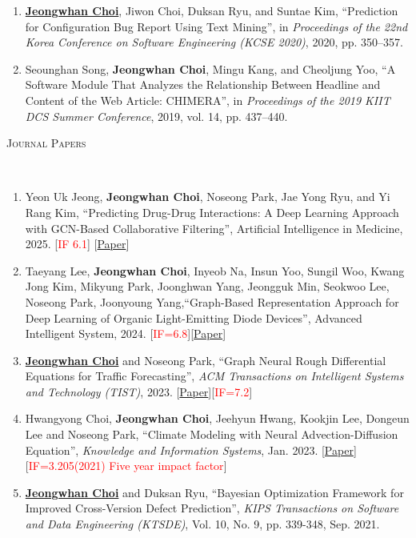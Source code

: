 \documentclass[10pt]{article}
\newenvironment{changemargin}[2]{
  \begin{list}{}{
    \setlength{\topsep}{0pt}
    \setlength{\leftmargin}{#1}
    \setlength{\rightmargin}{#2}
    \setlength{\listparindent}{\parindent}
    \setlength{\itemindent}{\parindent}
    \setlength{\parsep}{\parskip}
  }
  \item[]}{\end{list}
}
\newcommand{\lineover}{
	\begin{changemargin}{-0.05in}{-0.05in}
		\vspace*{-8pt}
		\hrulefill \\
		\vspace*{-2pt}
	\end{changemargin}
}
\newcommand{\RED}[1]{\textcolor{red}{#1}}
\newcommand{\textbu}[1]{\underline{\textbf{#1}}}
\newenvironment{body} {
	\vspace*{-16pt}
	\begin{changemargin}{-0.25in}{-0.5in}
  }
	{\end{changemargin}
}
\begin{document}
\begin{body}
\begin{enumerate}
    \item \textbu{Jeongwhan Choi}, Jiwon Choi, Duksan Ryu, and Suntae Kim, ``Prediction for Configuration Bug Report Using Text Mining'', in \emph{Proceedings of the 22nd Korea Conference on Software Engineering (KCSE 2020)}, 2020, pp. 350–357.
    \item Seounghan Song, \textbf{Jeongwhan Choi}, Mingu Kang, and Cheoljung Yoo, ``A Software Module That Analyzes the Relationship Between Headline and Content of the Web Article: CHIMERA'', in \emph{Proceedings of the 2019 KIIT DCS Summer Conference}, 2019, vol. 14, pp. 437–440.
\end{enumerate}


\vspace{1em}
\textsc{Journal Papers}
\lineover
\begin{enumerate}
    \item Yeon Uk Jeong, \textbf{Jeongwhan Choi}, Noseong Park, Jae Yong Ryu, and Yi Rang Kim, ``Predicting Drug-Drug Interactions: A Deep Learning Approach with GCN-Based Collaborative Filtering'', Artificial Intelligence in Medicine, 2025. [\RED{IF 6.1}] [\href{https://doi.org/10.1016/j.artmed.2025.103185}{Paper}]
    \item Taeyang Lee, \textbf{Jeongwhan Choi}, Inyeob Na, Insun Yoo, Sungil Woo, Kwang Jong Kim, Mikyung Park, Joonghwan Yang, Jeongguk Min, Seokwoo Lee, Noseong Park, Joonyoung Yang,``Graph-Based Representation Approach for Deep Learning of Organic Light-Emitting Diode Devices'', Advanced Intelligent System, 2024. [\RED{IF=6.8}][\href{https://onlinelibrary.wiley.com/doi/10.1002/aisy.202400598}{Paper}]
    \item \textbu{Jeongwhan Choi} and Noseong Park, ``Graph Neural Rough Differential Equations for Traffic Forecasting'', \emph{ACM Transactions on Intelligent Systems and Technology (TIST)}, 2023. [\href{https://dl.acm.org/doi/abs/10.1145/3604808}{Paper}][\RED{IF=7.2}]
    \item Hwangyong Choi, \textbf{Jeongwhan Choi}, Jeehyun Hwang, Kookjin Lee, Dongeun Lee and Noseong Park, ``Climate Modeling with Neural Advection-Diffusion Equation'', \emph{Knowledge and Information Systems}, Jan. 2023. [\href{https://doi.org/10.1007/s10115-023-01829-2}{Paper}] [\RED{IF=3.205(2021) Five year impact factor}]
    \item \textbu{Jeongwhan Choi} and Duksan Ryu, ``Bayesian Optimization Framework for Improved Cross-Version Defect Prediction'', \emph{KIPS Transactions on Software and Data Engineering (KTSDE)}, Vol. 10, No. 9, pp. 339-348, Sep. 2021.

\end{enumerate}
\end{body}
\end{document}
